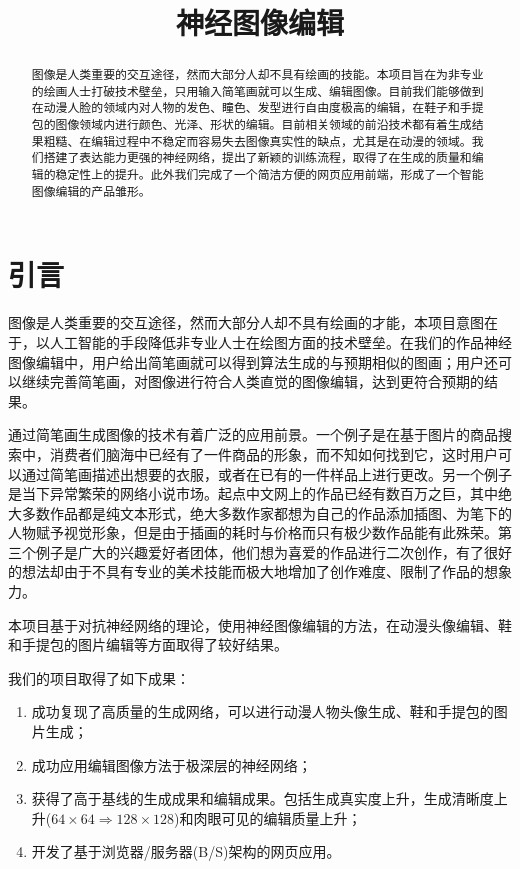 \documentclass[a4paper,12pt,UTF8]{ctexart}
\title{神经图像编辑}
\begin{document}
\maketitle


\begin{abstract}

图像是人类重要的交互途径，然而大部分人却不具有绘画的技能。本项目旨在为非专业的绘画人士打破技术壁垒，只用输入简笔画就可以生成、编辑图像。目前我们能够做到在动漫人脸的领域内对人物的发色、瞳色、发型进行自由度极高的编辑，在鞋子和手提包的图像领域内进行颜色、光泽、形状的编辑。目前相关领域的前沿技术都有着生成结果粗糙、在编辑过程中不稳定而容易失去图像真实性的缺点，尤其是在动漫的领域。我们搭建了表达能力更强的神经网络，提出了新颖的训练流程，取得了在生成的质量和编辑的稳定性上的提升。此外我们完成了一个简洁方便的网页应用前端，形成了一个智能图像编辑的产品雏形。

\end{abstract}

\section{引言}

图像是人类重要的交互途径，然而大部分人却不具有绘画的才能，本项目意图在于，以人工智能的手段降低非专业人士在绘图方面的技术壁垒。在我们的作品神经图像编辑中，用户给出简笔画就可以得到算法生成的与预期相似的图画；用户还可以继续完善简笔画，对图像进行符合人类直觉的图像编辑，达到更符合预期的结果。

通过简笔画生成图像的技术有着广泛的应用前景。一个例子是在基于图片的商品搜索中，消费者们脑海中已经有了一件商品的形象，而不知如何找到它，这时用户可以通过简笔画描述出想要的衣服，或者在已有的一件样品上进行更改。另一个例子是当下异常繁荣的网络小说市场。起点中文网上的作品已经有数百万之巨，其中绝大多数作品都是纯文本形式，绝大多数作家都想为自己的作品添加插图、为笔下的人物赋予视觉形象，但是由于插画的耗时与价格而只有极少数作品能有此殊荣。第三个例子是广大的兴趣爱好者团体，他们想为喜爱的作品进行二次创作，有了很好的想法却由于不具有专业的美术技能而极大地增加了创作难度、限制了作品的想象力。




本项目基于对抗神经网络的理论，使用神经图像编辑的方法，在动漫头像编辑、鞋和手提包的图片编辑等方面取得了较好结果。

我们的项目取得了如下成果：

\begin{enumerate}
  \item 成功复现了高质量的生成网络，可以进行动漫人物头像生成、鞋和手提包的图片生成；
  \item 成功应用编辑图像方法于极深层的神经网络；
  \item 获得了高于基线的生成成果和编辑成果。包括生成真实度上升，生成清晰度上升($64 \times 64 \Rightarrow 128 \times 128$)和肉眼可见的编辑质量上升；
  \item 开发了基于浏览器/服务器(B/S)架构的网页应用。
\end{enumerate}
\end{document}
